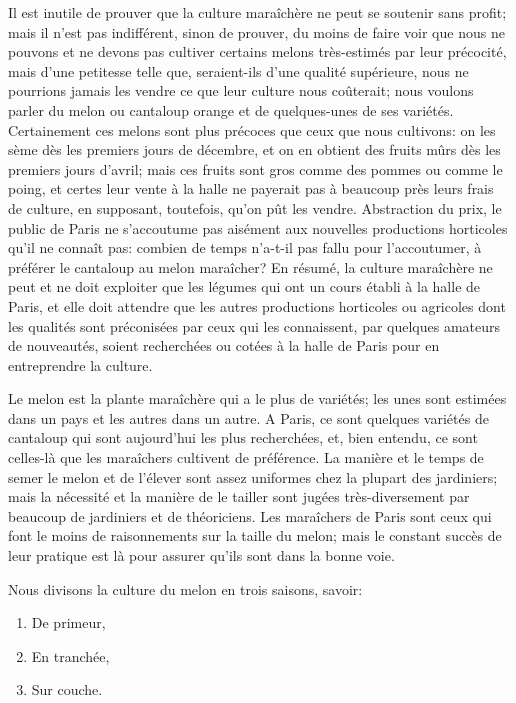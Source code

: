 \documentclass[10pt,a4paper]{book}
\begin{document}
Il est inutile de prouver que la culture maraîchère ne peut se soutenir sans profit; mais il n'est pas indifférent, sinon de prouver, du moins de faire voir que nous ne pouvons et ne devons pas cultiver certains melons très-estimés par leur précocité, mais d'une petitesse telle que, seraient-ils d'une qualité supérieure, nous ne pourrions jamais les vendre ce que leur culture nous coûterait; nous voulons parler du melon ou cantaloup orange et de quelques-unes de ses variétés. Certainement ces melons sont plus précoces que ceux que nous cultivons: on les sème dès les premiers jours de décembre, et on en obtient des fruits mûrs dès les premiers jours d'avril; mais ces fruits sont gros comme des pommes ou comme le poing, et certes leur vente à la halle ne payerait pas à beaucoup près leurs frais de culture, en supposant, toutefois, qu'on pût les vendre. Abstraction du prix, le public de Paris ne s'accoutume pas aisément aux nouvelles productions horticoles qu'il ne connaît pas: combien de temps n'a-t-il pas fallu pour l'accoutumer, à préférer le cantaloup au melon maraîcher? En résumé, la culture maraîchère ne peut et ne doit exploiter que les légumes qui ont un cours établi à la halle de Paris, et elle doit attendre que les autres productions horticoles ou agricoles dont les qualités sont préconisées par ceux qui les connaissent, par quelques amateurs de nouveautés, soient recherchées ou cotées à la halle de Paris pour en entreprendre la culture.

Le melon est la plante maraîchère qui a le plus de variétés; les unes sont estimées dans un pays et les autres dans un autre. A Paris, ce sont quelques variétés de cantaloup qui sont aujourd'hui les plus recherchées, et, bien entendu, ce sont celles-là que les maraîchers cultivent de préférence. La manière et le temps de semer le melon et de l'élever sont assez uniformes chez la plupart des jardiniers; mais la nécessité et la manière de le tailler sont jugées très-diversement par beaucoup de jardiniers et de théoriciens. Les maraîchers de Paris sont ceux qui font le moins de raisonnements sur la taille du melon; mais le constant succès de leur pratique est là pour assurer qu'ils sont dans la bonne voie.

Nous divisons la culture du melon en trois saisons, savoir:

\begin{enumerate}
\item De primeur,
\item En tranchée,
\item Sur couche.
\end{enumerate}
\end{document}
